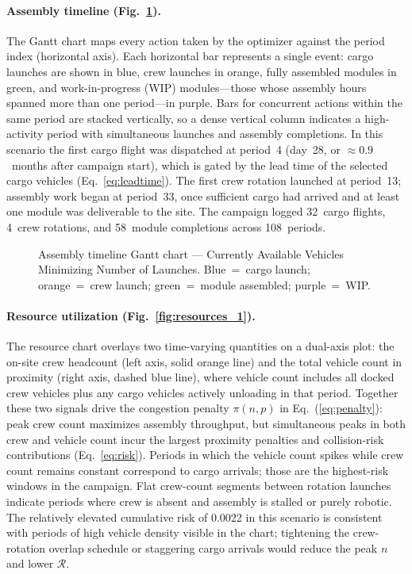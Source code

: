 \paragraph{Assembly timeline (Fig.~\ref{fig:gantt_1}).}
The Gantt chart maps every action taken by the optimizer against
the period index (horizontal axis).
Each horizontal bar represents a single event: cargo launches
are shown in blue, crew launches in orange, fully assembled
modules in green, and work-in-progress (WIP) modules---those
whose assembly hours spanned more than one period---in purple.
Bars for concurrent actions within the same period are stacked
vertically, so a dense vertical column indicates a high-activity
period with simultaneous launches and assembly completions.
In this scenario the first cargo flight was dispatched at
period~4
(day~28,
or $\approx0.9$~months
after campaign start), which is gated by the lead time of the
selected cargo vehicles
(Eq.~\ref{eq:leadtime}).
The first crew rotation launched at period~13;
assembly work began at period~33, once
sufficient cargo had arrived and at least one module was
deliverable to the site.
The campaign logged 32~cargo
flights,
4~crew rotations,
and 58~module
completions
across 108~periods.

\begin{figure}[htbp]
  \centering
  \resizebox{0.85\textwidth}{!}{}
  \caption{Assembly timeline Gantt chart ---
           Currently Available Vehicles Minimizing Number of Launches.
           Blue~=~cargo launch; orange~=~crew launch;
           green~=~module assembled; purple~=~WIP.}
  \label{fig:gantt_1}
\end{figure}

\paragraph{Resource utilization (Fig.~\ref{fig:resources_1}).}
The resource chart overlays two time-varying quantities on a
dual-axis plot: the on-site crew headcount (left axis, solid
orange line) and the total vehicle count in proximity (right
axis, dashed blue line), where vehicle count includes all
docked crew vehicles plus any cargo vehicles actively unloading
in that period.
Together these two signals drive the congestion penalty
$\pi(n,p)$ in Eq.~(\ref{eq:penalty}): peak crew count
maximizes assembly throughput, but simultaneous peaks in both
crew and vehicle count incur the largest proximity penalties
and collision-risk contributions (Eq.~\ref{eq:risk}).
Periods in which the vehicle count spikes while crew count
remains constant correspond to cargo arrivals; those are the
highest-risk windows in the campaign.
Flat crew-count segments between rotation launches indicate
periods where crew is absent and assembly is stalled or purely
robotic.
The relatively elevated cumulative risk of
0.0022 in this scenario
is consistent with periods of high vehicle density visible in the
chart; tightening the crew-rotation overlap schedule or
staggering cargo arrivals would reduce the peak $n$ and
lower $\mathcal{R}$.

